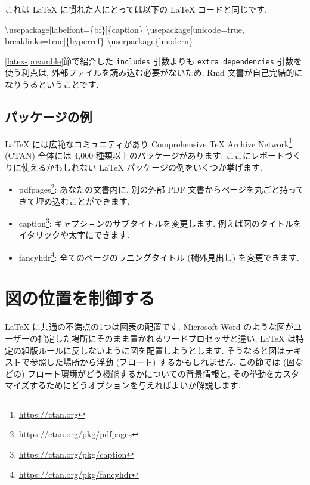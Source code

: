 \documentclass[
  11pt,
  lualatex,
  ja=standard]{bxjsreport}
\newenvironment{Shaded}{\begin{snugshade}}{\end{snugshade}}
\newcommand{\BuiltInTok}[1]{#1}
\newcommand{\ExtensionTok}[1]{#1}
\newcommand{\FunctionTok}[1]{\textcolor[rgb]{0.00,0.00,0.00}{#1}}
\newcommand{\NormalTok}[1]{#1}
\providecommand{\tightlist}{%
  \setlength{\itemsep}{0pt}\setlength{\parskip}{0pt}}
\renewcommand{\href}[2]{#2\footnote{\url{#1}}}
\begin{document}
これは LaTeX に慣れた人にとっては以下の LaTeX コードと同じです.

\begin{Shaded}
\begin{Highlighting}[]
\BuiltInTok{\textbackslash{}usepackage}\NormalTok{[labelfont=\{bf\}]\{}\ExtensionTok{caption}\NormalTok{\} }
\BuiltInTok{\textbackslash{}usepackage}\NormalTok{[unicode=true, breaklinks=true]\{}\ExtensionTok{hyperref}\NormalTok{\}}
\FunctionTok{\textbackslash{}userpackage}\NormalTok{\{lmodern\}}
\end{Highlighting}
\end{Shaded}

\ref{latex-preamble}節で紹介した \texttt{includes} 引数よりも \texttt{extra\_dependencies} 引数を使う利点は, 外部ファイルを読み込む必要がないため, Rmd 文書が自己完結的になりうるということです.

\hypertarget{example-packages}{%
\subsection{パッケージの例}\label{example-packages}}

LaTeX には広範なコミュニティがあり \href{https://ctan.org}{Comprehensive TeX Archive Network} (CTAN) 全体には 4,000 種類以上のパッケージがあります. ここにレポートづくりに使えるかもしれない LaTeX パッケージの例をいくつか挙げます.

\begin{itemize}
\tightlist
\item
  \href{https://ctan.org/pkg/pdfpages}{pdfpages}: あなたの文書内に, 別の外部 PDF 文書からページを丸ごと持ってきて埋め込むことができます.
\item
  \href{https://ctan.org/pkg/caption}{caption}: キャプションのサブタイトルを変更します. 例えば図のタイトルをイタリックや太字にできます.
\item
  \href{https://ctan.org/pkg/fancyhdr}{fancyhdr}: 全てのページのラニングタイトル (欄外見出し) を変更できます.
\end{itemize}

\hypertarget{figure-placement}{%
\section{図の位置を制御する}\label{figure-placement}}

LaTeX に共通の不満点の1つは図表の配置です. Microsoft Word のような図がユーザーの指定した場所にそのまま置かれるワードプロセッサと違い, LaTeX は特定の組版ルールに反しないように図を配置しようとします. そうなると図はテキストで参照した場所から浮動 (フロート) するかもしれません. この節では (図などの) フロート環境がどう機能するかについての背景情報と, その挙動をカスタマイズするためにどうオプションを与えればよいか解説します.
\end{document}
